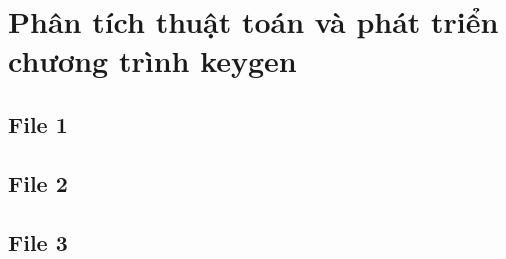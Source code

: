 \section{Phân tích thuật toán và phát triển chương trình keygen}

\subsection{File 1}

\newpage

\subsection{File 2}

\newpage

\subsection{File 3}

\newpage